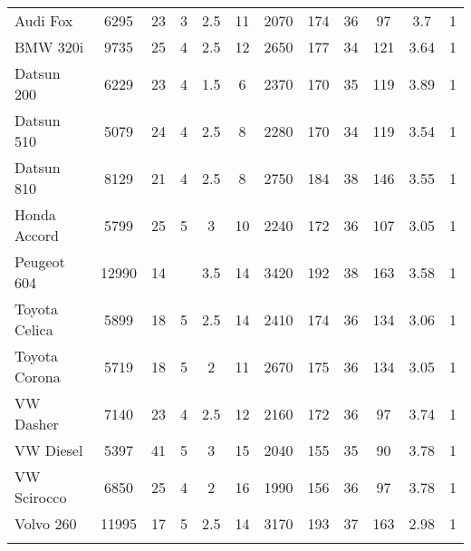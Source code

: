 \documentclass{article}
\begin{document}
\begin{table}[tbp]
{\begin{tabularx}{\textwidth}{lCCCCCCCCCCC}
Audi Fox&6295&23&3&2.5&11&2070&174&36&97&3.7&1 \tabularnewline \addlinespace[0.1cm]
BMW 320i&9735&25&4&2.5&12&2650&177&34&121&3.64&1 \tabularnewline \addlinespace[0.1cm]
Datsun 200&6229&23&4&1.5&6&2370&170&35&119&3.89&1 \tabularnewline \addlinespace[0.1cm]
Datsun 510&5079&24&4&2.5&8&2280&170&34&119&3.54&1 \tabularnewline \addlinespace[0.1cm]
Datsun 810&8129&21&4&2.5&8&2750&184&38&146&3.55&1 \tabularnewline \addlinespace[0.1cm]
Honda Accord&5799&25&5&3&10&2240&172&36&107&3.05&1 \tabularnewline \addlinespace[0.1cm]
Peugeot 604&12990&14&&3.5&14&3420&192&38&163&3.58&1 \tabularnewline \addlinespace[0.1cm]
Toyota Celica&5899&18&5&2.5&14&2410&174&36&134&3.06&1 \tabularnewline \addlinespace[0.1cm]
Toyota Corona&5719&18&5&2&11&2670&175&36&134&3.05&1 \tabularnewline \addlinespace[0.1cm]
VW Dasher&7140&23&4&2.5&12&2160&172&36&97&3.74&1 \tabularnewline \addlinespace[0.1cm]
VW Diesel&5397&41&5&3&15&2040&155&35&90&3.78&1 \tabularnewline \addlinespace[0.1cm]
VW Scirocco&6850&25&4&2&16&1990&156&36&97&3.78&1 \tabularnewline \addlinespace[0.1cm]
Volvo 260&11995&17&5&2.5&14&3170&193&37&163&2.98&1 \tabularnewline \addlinespace[0.1cm]
\bottomrule \addlinespace[1.5ex]

\end{tabularx}
}
\end{table}
\end{document}
